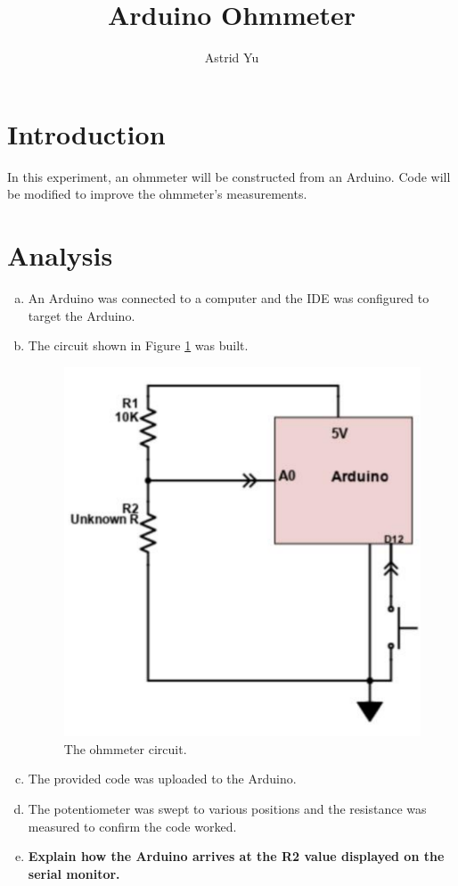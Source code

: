 \documentclass[12pt]{article}
\author{Astrid Yu}
\title{Arduino Ohmmeter}
\begin{document}
\maketitle

\section*{Introduction}

In this experiment, an ohmmeter will be constructed from an Arduino. 
Code will be modified to improve the ohmmeter's measurements. 

\section*{Analysis}

\begin{enumerate}[a.]
    \item An Arduino was connected to a computer and the IDE was configured 
    to target the Arduino.
    \item The circuit shown in Figure \ref{fig:circuit} was built.
    \begin{figure}[H]
      \centering
      \includegraphics[width=0.5\linewidth]{circuit.png}
      \caption{The ohmmeter circuit.}
      \label{fig:circuit}
    \end{figure}
    
    \item The provided code was uploaded to the Arduino.
    \item The potentiometer was swept to various positions and the resistance was 
    measured to confirm the code worked.
    \item \textbf{Explain how the Arduino arrives at the R2 value displayed on the serial monitor.}
    

\end{enumerate}
\end{document}
